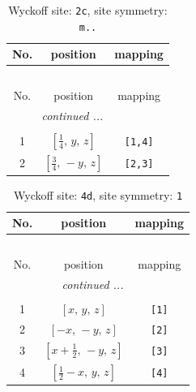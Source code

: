 \documentclass[fleqn,8pt]{jsarticle}
\begin{document}
\renewcommand{\arraystretch}{1.2}
\begin{longtable}{ccc}
\caption{Wyckoff site: {\tt 2c}, site symmetry: {\tt m..}}
 \\
 \hline \hline
No. & position & mapping \\ \hline \endfirsthead

\multicolumn{2}{l}{\tablename\ \thetable{}} \\
 \hline \hline
No. & position & mapping \\ \hline \endhead

 \hline \hline
\multicolumn{2}{r}{\footnotesize\it continued ...} \\ \endfoot

 \hline \hline
\multicolumn{2}{r}{} \\ \endlastfoot

1 & $\left[ \frac{1}{4},\, y,\, z \right]$ & {\tt [1,4]} \\ \hline
2 & $\left[ \frac{3}{4},\, - y,\, z \right]$ & {\tt [2,3]} \\
\end{longtable}
\renewcommand{\arraystretch}{1.2}
\begin{longtable}{ccc}
\caption{Wyckoff site: {\tt 4d}, site symmetry: {\tt 1}}
 \\
 \hline \hline
No. & position & mapping \\ \hline \endfirsthead

\multicolumn{2}{l}{\tablename\ \thetable{}} \\
 \hline \hline
No. & position & mapping \\ \hline \endhead

 \hline \hline
\multicolumn{2}{r}{\footnotesize\it continued ...} \\ \endfoot

 \hline \hline
\multicolumn{2}{r}{} \\ \endlastfoot

1 & $\left[ x,\, y,\, z \right]$ & {\tt [1]} \\ \hline
2 & $\left[ - x,\, - y,\, z \right]$ & {\tt [2]} \\ \hline
3 & $\left[ x + \frac{1}{2},\, - y,\, z \right]$ & {\tt [3]} \\ \hline
4 & $\left[ \frac{1}{2} - x,\, y,\, z \right]$ & {\tt [4]} \\
\end{longtable}
\end{document}
